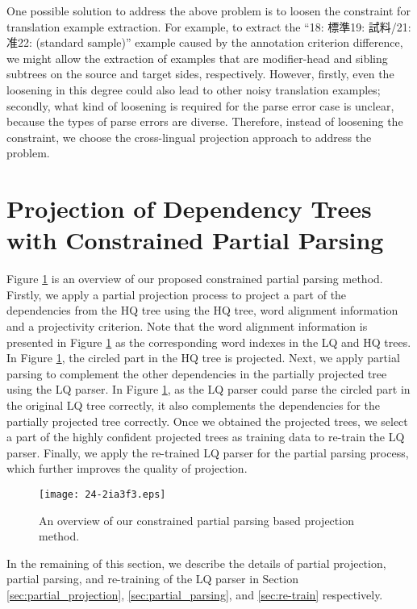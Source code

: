 \documentclass[english]{jnlp_1.4}
\begin{document}
One possible solution to address the above problem is to loosen the constraint for translation 
example extraction. For example, to extract the ``18: 標準19: 試料/21: 准22:  (standard sample)'' 
example caused by the annotation criterion difference, we might allow the extraction of examples that 
are modifier-head and sibling subtrees on the source and target sides, respectively. 
However, firstly, even the loosening in this degree could also lead to other noisy translation 
examples; secondly, what kind of loosening is required for the parse error case is unclear, 
because the types of parse errors are diverse. Therefore, 
instead of loosening the constraint, we choose the cross-lingual projection approach to address the problem.


\section{Projection of Dependency Trees with Constrained Partial Parsing}

Figure \ref{fig:overview} is an overview of our proposed constrained partial parsing method. 
Firstly, we apply a partial projection process to project a part of the dependencies from the
HQ tree using the HQ tree, word alignment information and a projectivity criterion.
Note that the word alignment information is presented in Figure \ref{fig:overview} as the corresponding
word indexes in the LQ and HQ trees.
In Figure \ref{fig:overview}, the circled part in the HQ tree is projected. Next, we apply partial
parsing to complement the other dependencies in the partially projected tree using the LQ parser.
In Figure \ref{fig:overview}, as the LQ parser could parse the circled part in the original LQ tree correctly,
it also complements the dependencies for the partially projected tree correctly. Once we obtained
the projected trees, we select a part of the highly confident projected trees as training data to
re-train the LQ parser. Finally, we apply the re-trained LQ parser for the partial parsing process,
which further improves the quality of projection.

\begin{figure}[b]
\begin{center}
\texttt{[image: 24-2ia3f3.eps]}
\end{center}
\caption{An overview of our constrained partial parsing based projection method.}
\label{fig:overview}
\end{figure}

In the remaining of this section, we describe the details of partial projection, partial parsing,
and re-training of the LQ parser in Section \ref{sec:partial_projection}, \ref{sec:partial_parsing},
and \ref{sec:re-train} respectively.
\end{document}
